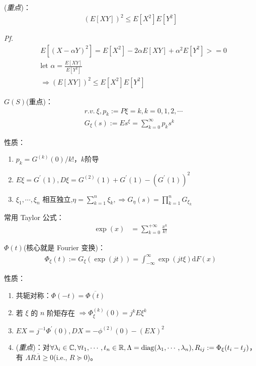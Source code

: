 
(\emph{重点})：
\begin{align*}
	(E[XY])^2 \le E[X^2]E[Y^2]
\end{align*}

\emph*{Pf.}
\begin{align*}
	&E[(X-\alpha Y)^2] = E[X^2] - 2\alpha E[XY] + \alpha^2E[Y^2]>= 0 \\
	&\text{let } \alpha = \frac{E[XY]}{E[Y^2]} \\
	&\Rightarrow (E[XY])^2 \le E[X^2]E[Y^2]
\end{align*}


$G(S)$(重点)：
\begin{align*}
	&r.v.\ \xi, p_k := P{\xi = k}, k=0,1,2,\cdots\\
	&G_\xi(s) := Es^\xi = \sum_{k=0}^\infty p_k s^k
\end{align*}

性质：
\begin{enumerate}
	\item $p_k = G^{(k)}(0)/k!$，$k$阶导
	\item $E\xi = G^\prime(1), D\xi = G^{(2)}(1) + G^\prime(1) - (G^\prime(1))^2$
	\item $\xi_1, \cdots, \xi_n$ 相互独立,$\eta = \sum_{k=1}^n \xi_k, \Rightarrow G_\eta(s) = \prod_{k=1}^n G_{\xi_k}$
\end{enumerate}

常用 Taylor 公式：
\begin{align*}
	\exp(x) &= \sum_{k=0}^{+\infty} \frac{x^k}{k!}
\end{align*}


$\Phi(t)$(核心就是 Fourier 变换)：
\begin{align*}
	\Phi_\xi(t) := G_\xi(\exp(\mathit{j}t)) = \int_{-\infty}^\infty \exp(jt\xi) \mathrm{d}F(x)
\end{align*}

性质：
\begin{enumerate}
	\item 共轭对称：$\Phi(-t) = \overline{\Phi(t)}$
	\item 若 $\xi$ 的 $n$ 阶矩存在 $\Rightarrow \Phi_{\xi}^{(k)}(0) = j^k E\xi^k$
	\item $EX = j^{-1} \Phi^\prime(0), DX = - \phi^{(2)}(0) - (EX)^2$
	\item {}(\emph{重点})：对$\forall \lambda_i \in \mathbb{C}, \forall t_1,\cdots,t_n \in \R, \Lambda = \diag(\lambda_1, \cdots, \lambda_n), R_{ij} := \Phi_\xi(t_i - t_j)$，有 $\Lambda R \overline{\Lambda} \ge 0$(i.e., $R\succeq 0$)。
\end{enumerate}

